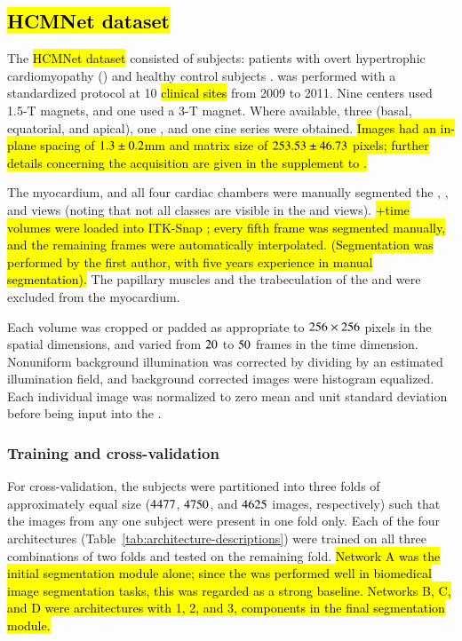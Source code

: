 
\subsection{\hl{HCMNet dataset}}



The \hl{HCMNet dataset} consisted of \NumPtT{} subjects: \NumPtO{} patients with overt hypertrophic cardiomyopathy (\HCM{}) and \NumPtC{} healthy control subjects \hl{\citep{Ho2017}}.
\CMR{} was performed with a standardized protocol at 10 \hl{clinical sites} from 2009 to 2011.
Nine centers used 1.5-T magnets, and one used a 3-T magnet.
Where available, three \SA{} (basal, equatorial, and apical), one \HLA{}, and one \VLA{} \SSFP{} cine series were obtained.
\hl{
Images had an in-plane spacing of $1.3{} \pm 0.2{}$mm and matrix size of $253.53{} \pm 46.73{}$ pixels; further details concerning the \CMR{} acquisition are given in the supplement to \citet{Ho2017}.
}

The \LV{} myocardium, and all four cardiac chambers were manually segmented the \SA{}, \HLA{}, and \VLA{} views (noting that not all classes are visible in the \SA{} and \VLA{} views).
\hl{
+time volumes were loaded into ITK-Snap \citep{Yushkevich2006}; every fifth frame was segmented manually, and the remaining frames were automatically interpolated.
(Segmentation was performed by the first author, with five years experience in manual \CMR{} segmentation).
}
The papillary muscles and the trabeculation of the \LV{} and \RV{} were excluded from the myocardium.

Each volume was cropped or padded as appropriate to $256 \times 256$ pixels in the spatial dimensions, and varied from $20{}$ to $50{}$ frames in the time dimension.
Nonuniform background illumination was corrected by dividing by an estimated illumination field, and background corrected images were histogram equalized.
Each individual image was normalized to zero mean and unit standard deviation before being input into the \CNN{}.

\subsubsection{Training and cross-validation}

For cross-validation, the subjects were partitioned into three folds of approximately equal size ($4477{}$, $4750{}$, and $4625{}$ images, respectively) such that the images from any one subject were present in one fold only.
Each of the four architectures (Table~\ref{tab:architecture-descriptions}) were trained on all three combinations of two folds and tested on the remaining fold.
\hl{
Network A was the \hl{initial} segmentation module alone; since the \UNet{} was performed well in biomedical image segmentation tasks, this was regarded as a strong baseline.
Networks B, C, and D were \omeganet{} architectures with 1, 2, and 3, \UNet{} components in the \hl{final} segmentation module.
}

